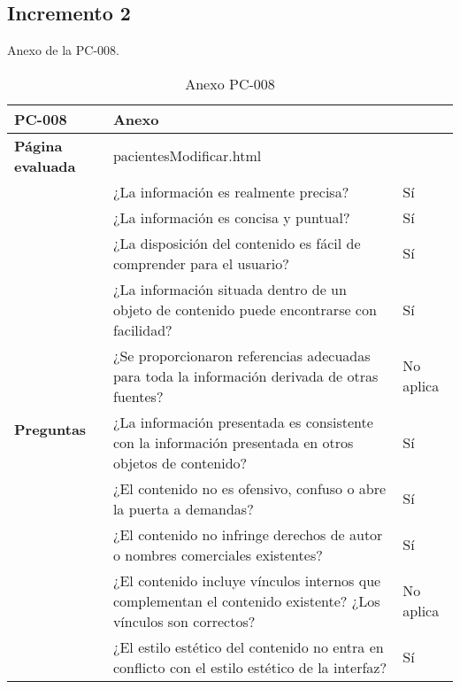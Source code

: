 \subsection{Incremento 2}

Anexo de la PC-008.

\begin{table}[htpb]
\centering
\begin{tabularx}{\textwidth}{|l|X|l|}
\hline
\textbf{PC-008}                       & \multicolumn{2}{l|}{Anexo}                                                                                                \\ \hline
\textbf{Página evaluada}             & \multicolumn{2}{l|}{pacientesModificar.html}                                                                              \\ \hline
\multirow{10}{*}{\textbf{Preguntas}} & ¿La información es realmente precisa?                                                                         & Sí        \\ \cline{2-3} 
                                     & ¿La información es concisa y puntual?                                                                         & Sí        \\ \cline{2-3} 
                                     & ¿La disposición del contenido es fácil de comprender para el usuario?                                         & Sí        \\ \cline{2-3} 
                                     & ¿La información situada dentro de un objeto de contenido puede encontrarse con facilidad?                     & Sí        \\ \cline{2-3} 
                                     & ¿Se proporcionaron referencias adecuadas para toda la información derivada de otras fuentes?                  & No aplica \\ \cline{2-3} 
                                     & ¿La información presentada es consistente con la información presentada en otros objetos de contenido?        & Sí        \\ \cline{2-3} 
                                     & ¿El contenido no es ofensivo, confuso o abre la puerta a demandas?                                            & Sí        \\ \cline{2-3} 
                                     & ¿El contenido no infringe derechos de autor o nombres comerciales existentes?                                 & Sí        \\ \cline{2-3} 
                                     & ¿El contenido incluye vínculos internos que complementan el contenido existente? ¿Los vínculos son correctos? & No aplica \\ \cline{2-3} 
                                     & ¿El estilo estético del contenido no entra en conflicto con el estilo estético de la interfaz?                & Sí        \\ \hline
\end{tabularx}
\caption{Anexo PC-008}
\end{table}


